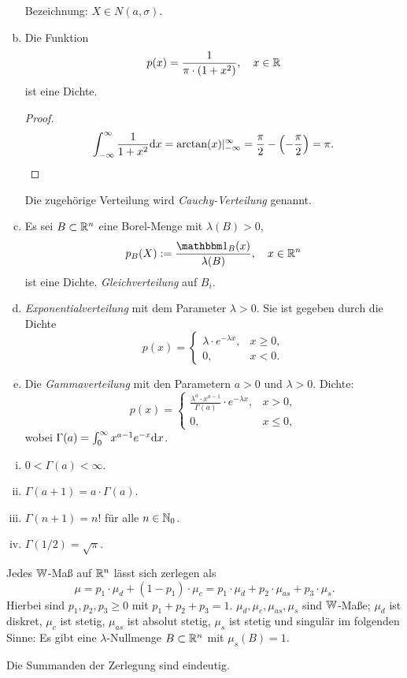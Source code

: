 \begin{exmp}
\begin{enumerate}[(a)]
    Bezeichnung: $X \in N(a,\sigma)$.
  \item Die Funktion
    \[ p(x) = \frac{1}{\pi \cdot (1+x^2)}, \quad x \in \mathbb{R} \]
    ist eine Dichte.
    \begin{proof}
      \[ \int_{-\infty}^\infty \frac{1}{1+x^2} \mathrm{d} x = \arctan(x)
        |_{-\infty}^\infty = \frac{\pi}{2} -
        \left( - \frac{\pi}{2} \right) = \pi. \qedhere\]
    \end{proof}
    Die zugehörige Verteilung wird \emph{Cauchy-Verteilung} genannt.
  \item Es sei $B \subset \mathbb{R}^n$ eine Borel-Menge mit $\lambda(B) > 0$,
    \[ p_B(X) := \frac{\ind_B(x)}{\lambda(B)}, \quad x \in \real^n \]
    ist eine Dichte. \emph{Gleichverteilung} auf $B_i$.
  \item \emph{Exponentialverteilung} mit dem Parameter $\lambda > 0$. Sie ist
    gegeben durch die Dichte
    \[ p(x) = \begin{cases}
        \lambda \cdot e^{-\lambda x}, &x \ge 0, \\
        0, &x < 0.
      \end{cases} \]
  \item Die \emph{Gammaverteilung} mit den Parametern $a > 0$ und $\lambda > 0$.
    Dichte:
    \[ p(x) = \begin{cases}
        \frac{\lambda^a \cdot x^{a-1}}{\Gamma(a)} \cdot e^{-\lambda x},
        & x > 0, \\
        0, &x \le 0,
      \end{cases} \]
    wobei $\Gamma(a) = \int_0^\infty x^{a-1}e^{-x} \mathrm{d} x$.
  \end{enumerate}
\end{exmp}

\begin{rmrk*}
  \begin{enumerate}[(i)]
  \item $0 < \Gamma(a) < \infty$.
  \item $\Gamma(a+1) = a \cdot \Gamma(a)$.
  \item $\Gamma(n+1) = n!$ für alle $n \in \mathbb{N}_0$.
  \item $\Gamma(1/2) = \sqrt{\pi}$.
  \end{enumerate}
\end{rmrk*}

\begin{thm}
  Jedes $\mathbb{W}$-Maß auf $\mathbb{R}^n$ lässt sich zerlegen als
  \[ \mu = p_1 \cdot \mu_d + (1-p_1) \cdot \mu_c = p_1 \cdot \mu_d + p_2 \cdot
    \mu_{as} +  p_3 \cdot \mu_s. \]
  Hierbei sind $p_1, p_2, p_3 \ge 0$ mit $p_1 + p_2 + p_3 = 1$. $\mu_d, \mu_c,
  \mu_{as}, \mu_s$ sind $\mathbb{W}$-Maße; $\mu_d$ ist diskret, $\mu_c$ ist stetig,
  $\mu_{as}$ ist absolut stetig, $\mu_s$ ist stetig und singulär im folgenden
  Sinne: Es gibt eine $\lambda$-Nullmenge $B \subset \mathbb{R}^n$ mit $\mu_s(B) =
  1$.

  Die Summanden der Zerlegung sind eindeutig.
\end{thm}

